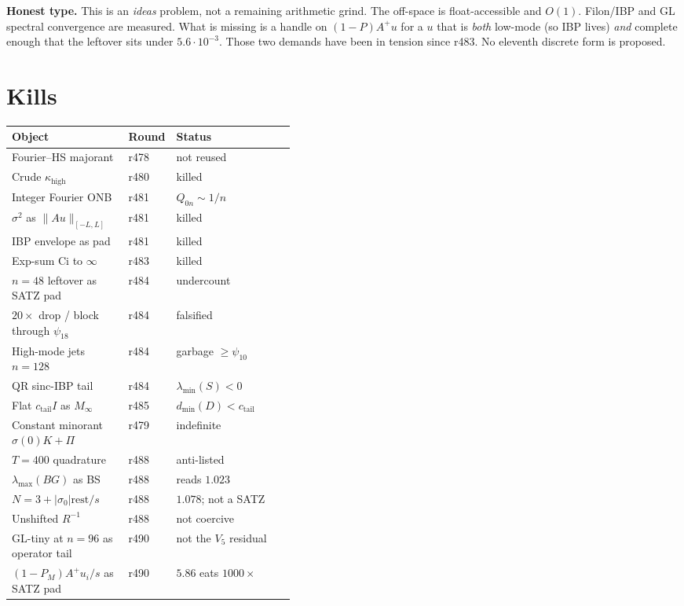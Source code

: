 \documentclass[11pt]{article}
\theoremstyle{remark}
\begin{document}
\noindent\textbf{Honest type.}
This is an \emph{ideas} problem, not a
remaining arithmetic grind.
The off-space is float-accessible and
$O(1)$.
Filon/IBP and GL spectral convergence
are measured.
What is missing is a handle on
$(1-P)A^+u$ for a $u$ that is
\emph{both} low-mode (so IBP lives)
\emph{and} complete enough that the
leftover sits under $5.6\cdot10^{-3}$.
Those two demands have been in tension
since r483.
No eleventh discrete form is proposed.

\section{Kills}

\begin{center}
\small
\begin{tabular}{@{}llp{0.42\linewidth}@{}}
\toprule
Object & Round & Status \\
\midrule
Fourier--HS majorant & r478 & not reused \\
Crude $\kappa_{\mathrm{high}}$ & r480 & killed \\
Integer Fourier ONB & r481 & $Q_{0n}\sim1/n$ \\
$\sigma^2$ as $\|Au\|_{[-L,L]}$ & r481 & killed \\
IBP envelope as pad & r481 & killed \\
Exp-sum Ci to $\infty$ & r483 & killed \\
$n=48$ leftover as SATZ pad & r484 & undercount \\
$20\times$ drop / block through $\psi_{18}$
  & r484 & falsified \\
High-mode jets $n=128$ & r484 & garbage $\ge\psi_{10}$ \\
QR sinc-IBP tail & r484 & $\lambda_{\min}(S)<0$ \\
Flat $c_{\mathrm{tail}}I$ as $M_\infty$
  & r485 & $d_{\min}(D)<c_{\mathrm{tail}}$ \\
Constant minorant $\sigma(0)K+\Pi$
  & r479 & indefinite \\
$T=400$ quadrature & r488 & anti-listed \\
$\lambda_{\max}(BG)$ as BS & r488 & reads $1.023$ \\
$N=3+|\sigma_0|\mathrm{rest}/s$
  & r488 & $1.078$; not a SATZ \\
Unshifted $R^{-1}$ & r488 & not coercive \\
GL-tiny at $n=96$ as operator tail
  & r490 & not the $V_5$ residual \\
$(1-P_M)A^+u_i/s$ as SATZ pad
  & r490 & $5.86$ eats $1000\times$ \\
\bottomrule
\end{tabular}
\end{center}
\end{document}
